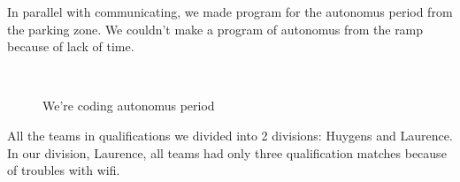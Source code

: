 In parallel with communicating, we made program for the autonomus period from the parking zone. We couldn't make a program of autonomus from the ramp because of lack of time.\newline
\begin{figure}[H]
	\begin{minipage}[h]{0.2\linewidth}
		\center  
	\end{minipage}
	\begin{minipage}[h]{0.6\linewidth}
		\caption{We're coding autonomus period}
	\end{minipage}
\end{figure}

All the teams in qualifications we divided into 2 divisions: Huygens and Laurence. In our division, Laurence, all teams had only three qualification matches because of troubles with wifi.\newline

